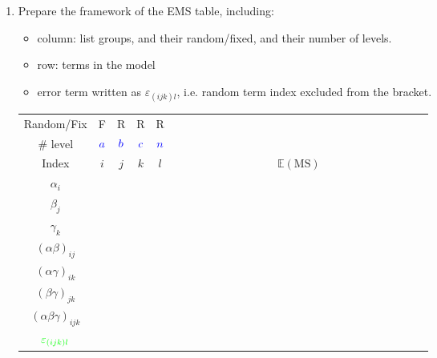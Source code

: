 \begin{enumerate}[topsep=2pt,itemsep=2pt]
    \item Prepare the framework of the EMS table, including:
    \begin{itemize}[topsep=2pt,itemsep=0pt]
        \item column: list groups, and their {\color{red}random/fixed}, and their {\color{blue}number of levels}.
        \item row: terms in the model
        \item {\color{green}error term} written as $ \varepsilon _{(ijk)l} $, i.e. random term index excluded from the bracket.
    \end{itemize}
    
    \begin{table}[H]
        \centering
        \renewcommand\arraystretch{1}
        \begin{tabular}{cccccc}
            \hline
            \hline
            Random/Fix                      &{\color{red}F}      &{\color{red}R}      &{\color{red}R}      &{\color{red}R}      &$ \qquad\qquad\qquad\qquad\qquad\qquad\qquad\qquad\qquad\qquad\qquad$\\
            \# level                        &$ \color{blue}a $  &$ \color{blue}b $  &$ \color{blue}c $  &$ \color{blue}n $  &\\
            Index                           &$ i $  &$ j $  &$ k $  &$ l $  &$ \mathbb{E}\left( \mathrm{MS}  \right)  $\\
            \hline
            $ \alpha _i $                   &       &       &       &       &\\
            $ \beta _j $                    &       &       &       &       &\\
            $ \gamma _k $                   &       &       &       &       &\\
            $ (\alpha \beta )_{ij} $        &       &       &       &       &\\
            $ (\alpha \gamma )_{ik} $       &       &       &       &       &\\
            $ (\beta \gamma )_{jk} $        &       &       &       &       &\\
            $ (\alpha \beta \gamma )_{ijk} $&       &       &       &       &\\
            $ \color{green}\varepsilon _{(ijk)l} $       &       &       &       &       &\\
            \hline
            \hline
        \end{tabular}
        \label{}
    \end{table}


\end{enumerate}
